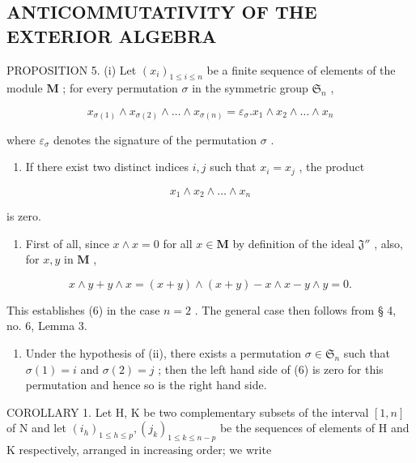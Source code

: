 \subsection{ANTICOMMUTATIVITY OF THE EXTERIOR ALGEBRA}

PROPOSITION 5. (i) Let \((x_{i})_{1\leqslant i\leqslant n}\) be a finite sequence of elements of the module \(\mathbf{M}\) ; for every permutation \(\sigma\) in the symmetric group \(\mathfrak{S}_n\) ,

\[
x _ {\sigma (1)} \wedge x _ {\sigma (2)} \wedge \dots \wedge x _ {\sigma (n)} = \varepsilon_ {\sigma}. x _ {1} \wedge x _ {2} \wedge \dots \wedge x _ {n}\tag{6}
\]

where \(\varepsilon_{\sigma}\) denotes the signature of the permutation \(\sigma\) .

\begin{enumerate}
\def\labelenumi{(\roman{enumi})}
\setcounter{enumi}{1}
\tightlist
\item
  If there exist two distinct indices \(i, j\) such that \(x_{i} = x_{j}\) , the product
\end{enumerate}

\[
x _ {1} \wedge x _ {2} \wedge \dots \wedge x _ {n}
\]

is zero.

\begin{enumerate}
\def\labelenumi{(\roman{enumi})}
\tightlist
\item
  First of all, since \(x \wedge x = 0\) for all \(x \in \mathbf{M}\) by definition of the ideal \(\mathfrak{J}''\) , also, for \(x, y\) in \(\mathbf{M}\) ,
\end{enumerate}

\[
x \wedge y + y \wedge x = (x + y) \wedge (x + y) - x \wedge x - y \wedge y = 0.
\]

This establishes (6) in the case \(n = 2\) . The general case then follows from § 4, no. 6, Lemma 3.

\begin{enumerate}
\def\labelenumi{(\roman{enumi})}
\setcounter{enumi}{1}
\tightlist
\item
  Under the hypothesis of (ii), there exists a permutation \(\sigma \in \mathfrak{S}_n\) such that \(\sigma(1) = i\) and \(\sigma(2) = j\) ; then the left hand side of (6) is zero for this permutation and hence so is the right hand side.
\end{enumerate}

COROLLARY 1. Let H, K be two complementary subsets of the interval \([1, n]\) of N and let \((i_{h})_{1 \leqslant h \leqslant p}, (j_{k})_{1 \leqslant k \leqslant n - p}\) be the sequences of elements of H and K respectively, arranged in increasing order; we write

